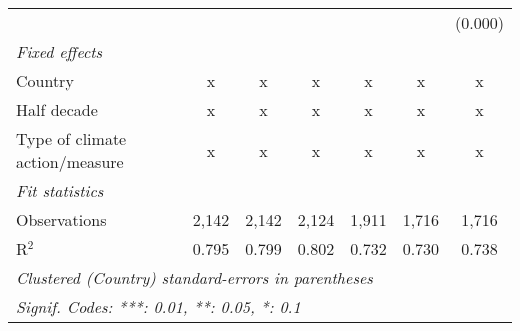 \begin{tabular}{lcccccc}
                                                  &         &                &                &                &                & (0.000)\\   
   \emph{Fixed effects}\\
   Country                                        & x       & x              & x              & x              & x              & x\\  
   Half decade                                    & x       & x              & x              & x              & x              & x\\  
   Type of climate action/measure                 & x       & x              & x              & x              & x              & x\\  
   \midrule \emph{Fit statistics}\\
   Observations                                   & 2,142   & 2,142          & 2,124          & 1,911          & 1,716          & 1,716\\  
   R$^2$                                          & 0.795   & 0.799          & 0.802          & 0.732          & 0.730          & 0.738\\  
   \midrule
   \multicolumn{7}{l}{\emph{Clustered (Country) standard-errors in parentheses}}\\
   \multicolumn{7}{l}{\emph{Signif. Codes: ***: 0.01, **: 0.05, *: 0.1}}\\
\end{tabular}
\par\endgroup


